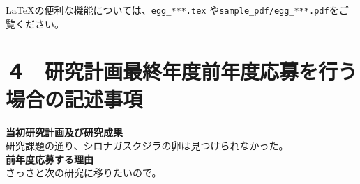 \documentclass[11pt,a4j,dvipdfmx]{jarticle} 					%
\newcommand{\研究課題名}{象の卵}
\newcommand{\研究機関名}{逢坂大学}
\newcommand{\研究代表者氏名}{湯川秀樹}
\newcommand{\研究期間の最終元号年度}{10}  %
\begin{document}
	\LaTeX の便利な機能については、\texttt{egg\_***.tex} や\texttt{sample\_pdf/egg\_***.pdf}をご覧ください。




\section{４　研究計画最終年度前年度応募を行う場合の記述事項}

\newcommand{\最終年度研究種目名}{基盤研究（Z）}
\newcommand{\最終年度研究課題番号}{99999}
\newcommand{\最終年度研究課題名}{シロナガスクジラの卵はなぜ見つけられないのか}
\newcommand{\最終年度研究期間}{平成25年度〜令和\一年目 年度}


\noindent
\textbf{当初研究計画及び研究成果}\\
	研究課題の通り、シロナガスクジラの卵は見つけられなかった。
\\

\noindent
\textbf{前年度応募する理由}\\
	さっさと次の研究に移りたいので。



\end{document}
